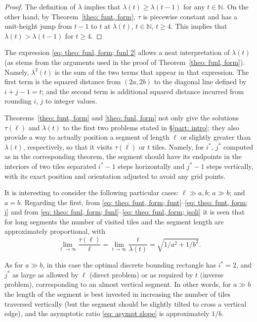 \documentclass[12pt, a4paper]{article}
\newcommand{\funt}{\tau} %
\newcommand{\funl}{\lambda} %
\newcommand{\len}{\ell} %
\newcommand{\tiles}{t} %
\newcommand{\isoli}{i^\ast}
\newcommand{\jsoli}{j^\ast}
\begin{document}
\begin{proof}
The definition of $\funl$ implies that $\funl(\tiles) \geq \funl(\tiles-1)$ for any $\tiles \in \mathbb N$. On the other hand, 
by Theorem~\ref{theo: funt, form}, $\funt$ is piecewise constant and has a unit-height jump from $\tiles-1$ to $\tiles$ at $\funl(\tiles)$, $\tiles \in \mathbb N$, $\tiles \geq 4$. This implies that $\funl(\tiles) > \funl(\tiles-1)$ for $\tiles \geq 4$.
\end{proof}

The expression \eqref{eq: theo: funl, form; funl 2} allows a neat interpretation of $\funl(\tiles)$ (as stems from the arguments used in the proof of Theorem~\ref{theo: funl, form}). Namely, $\funl^2(\tiles)$ is the sum of the two terms that appear in that expression. The first term is the squared distance from $(2a, 2b)$ to the diagonal line defined by $i+j-1=t$; and the second term is additional squared distance incurred from rounding $i$, $j$ to integer values.

Theorems~\ref{theo: funt, form} and \ref{theo: funl, form} not only give the solutions $\funt(\len)$ and $\funl(\tiles)$ to the first two problems stated in \S\ref{part: intro}; they also provide a way to actually position a segment of length $\len$ or slightly greater than $\funl(\tiles)$, respectively, so that it visits $\funt(\len)$ or $\tiles$ tiles. Namely, for $\isoli$, $\jsoli$ computed as in the corresponding theorem, the segment should have its endpoints in the interiors of two tiles separated $\isoli-1$ steps horizontally and $\jsoli-1$ steps vertically, with its exact position and orientation  adjusted to avoid any grid points.

It is interesting to consider the following particular cases: $\len \gg a,b$; $a \gg b$; and $a=b$. Regarding the first, from \eqref{eq: theo: funt, form; funt}--\eqref{eq: theo: funt, form; j}
and from \eqref{eq: theo: funl, form; funl}--\eqref{eq: theo: funl, form; jsoli}
it is seen that for long segments the number of visited tiles and the segment length are approximately proportional, with
\begin{equation}
\label{eq: asympt slope}
\lim_{\len \rightarrow \infty} \frac{\funt(\len)}{\len}
= \lim_{\tiles \rightarrow \infty} \frac{\tiles}{\funl(\tiles)}
= \sqrt{1/a^2 + 1/b^2}.
\end{equation}

As for $a \gg b$, in this case the optimal discrete bounding rectangle has $\isoli = 2$, and $\jsoli$ as large as allowed by $\len$ (direct problem) or as required by $\tiles$ (inverse problem), corresponding to an almost vertical segment. In other words, for $a \gg b$ the length of the segment is best invested in increasing the number of tiles traversed vertically (but the segment should be slightly tilted to cross a vertical edge), and the asymptotic ratio \eqref{eq: asympt slope} is approximately $1/b$.
\end{document}
